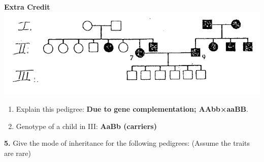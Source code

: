 \documentclass[plain,basic]{inVerba-notes}
\begin{document}
    \begin{center}
        \textbf{Extra Credit}\qquad\qquad\includegraphics[scale=0.5]{images/pedigree-5.png}
    \end{center}
    \begin{enumerate}[label=\alph*]
        \item Explain this pedigree: \textbf{Due to gene complementation; AAbb×aaBB}.
        \item Genotype of a child in III\@: \textbf{AaBb (carriers)}
    \end{enumerate}

    \textbf{5.} Give the mode of inheritance for the following pedigrees: (Assume the traits are rare)
\end{document}
